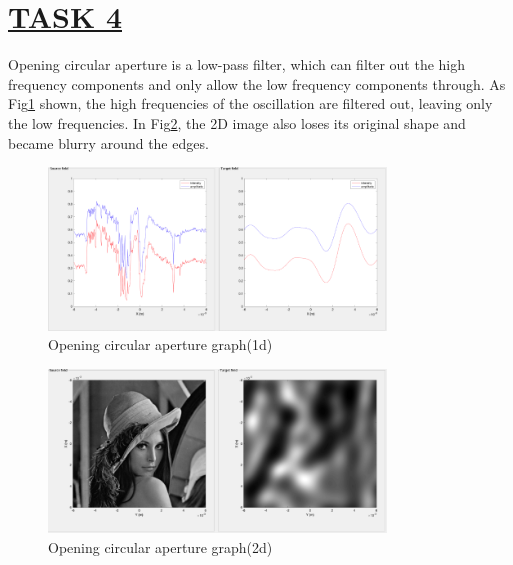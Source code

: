 \documentclass[fontsize=11pt]{scrartcl}
\begin{document}
\section{\uline{TASK 4}}
Opening circular aperture is a low-pass filter, which can filter out 
the high frequency components and only allow the low frequency components through. 
As Fig\ref{fig4.1} shown, the high frequencies of the oscillation are filtered out, 
leaving only the low frequencies. In Fig\ref{fig4.2}, the 2D image also loses its original shape 
and became blurry around the edges. 
\begin{figure}[H]
    \centering
     \includegraphics[width=0.8\textwidth]{img/4_1.png}
     \caption{Opening circular aperture graph(1d)}
     \label{fig4.1}
\end{figure}
\begin{figure}[H]
    \centering
     \includegraphics[width=0.8\textwidth]{img/4_2.png}
     \caption{Opening circular aperture graph(2d)}
     \label{fig4.2}
\end{figure}
\end{document}
